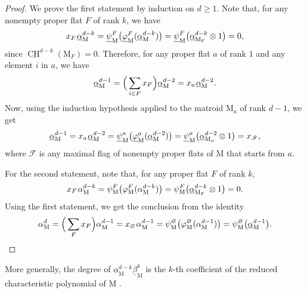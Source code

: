 \documentclass[11pt,reqno]{amsart}
\theoremstyle{definition}
\theoremstyle{remark}
\renewcommand{\(}{\left(}
\renewcommand{\)}{\right)}
\newcommand{\<}{\left<}
\renewcommand{\>}{\right>}
\newcommand{\CH}{\operatorname{CH}}
\begin{document}
\begin{proof}
We prove  the first statement by induction on  $d \ge 1$.
Note that, for any nonempty proper flat $F$ of rank $k$, we have
\[
x_F\hspace{0.3mm}  \underline{\alpha}_\mathrm{M}^{d-k}= \underline{\psi}^F_\mathrm{M}  \big( \underline{\varphi}^F_\mathrm{M} ( \underline{\alpha}_\mathrm{M}^{d-k} )\big)
= \underline{\psi}^F_\mathrm{M} \big(  \underline{\alpha}_\mathrm{M_F}^{d-k} \otimes 1 \big)=0,
\]
since $\underline{\mathrm{\CH}}^{d-k}(\mathrm{M}_F) = 0$.  Therefore, for any proper flat $a$ of rank $1$ and any element $i$ in $a$, we have
\[
\underline{\alpha}_\mathrm{M}^{d-1}= \Big(\sum_{i \in F} x_F\Big)\underline{\alpha}_\mathrm{M}^{d-2} =x_a\hspace{0.3mm}  \underline{\alpha}_\mathrm{M}^{d-2}.
\]
Now, using the induction hypothesis applied to the matroid $\mathrm{M}_a$ of rank $d-1$, we get
\[
\underline{\alpha}_\mathrm{M}^{d-1}=x_a\hspace{0.3mm}  \underline{\alpha}_\mathrm{M}^{d-2}
= \underline{\psi}^a_\mathrm{M}  \big( \underline{\varphi}^a_\mathrm{M} ( \underline{\alpha}_\mathrm{M}^{d-2} )\big)
= \underline{\psi}^a_\mathrm{M} \big(  \underline{\alpha}_{\mathrm{M}_a}^{d-2} \otimes 1 \big)
=x_\mathscr{F},
\]
where $\mathscr{F}$ is any maximal flag of nonempty proper flats of $\mathrm{M}$ that starts from $a$.

For the second statement,
note that, for any proper flat $F$ of rank $k$, 
\[
x_F\hspace{0.3mm}  \alpha_\mathrm{M}^{d-k}=\psi^F_\mathrm{M}  \big(\varphi^F_\mathrm{M} ( \alpha_\mathrm{M}^{d-k} )\big)
=\psi^F_\mathrm{M} \big(  \underline{\alpha}_\mathrm{M_F}^{d-k} \otimes 1 \big)=0.
\]
Using the first statement, we get the conclusion from the identity
\[
\alpha_\mathrm{M}^d=
 \Big(  \sum_F x_F \Big) \alpha_\mathrm{M}^{d-1}=x_\varnothing \hspace{0.3mm} \alpha_\mathrm{M}^{d-1}=
 \psi^\varnothing_\mathrm{M} \big( \varphi^\varnothing_\mathrm{M} ( \alpha_\mathrm{M}^{d-1} )\big)
=\psi^\varnothing_\mathrm{M} \big(\underline{\alpha}_\mathrm{M}^{d-1}\big). \qedhere
\]
\end{proof}

More generally, the degree of $\underline{\alpha}_\mathrm{M}^{d-k} \underline{\beta}_\mathrm{M}^k$ is the $k$-th coefficient of the reduced characteristic polynomial of $\mathrm{M}$ \cite[Proposition 9.5]{AHK}.
\end{document}
